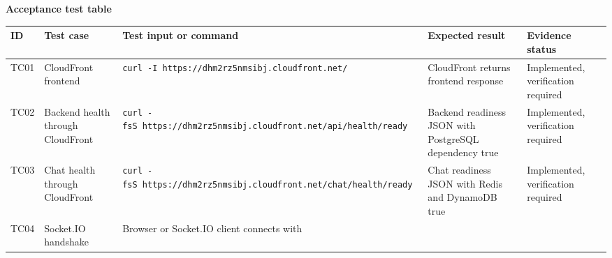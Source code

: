 \vspace{0.5em}\noindent\textbf{Acceptance test table}\par

{
\begingroup
\small
\setlength{\tabcolsep}{3pt}
\renewcommand{\arraystretch}{1.15}
\begin{longtable}{@{}
  >{\raggedright\arraybackslash}p{}
  >{\raggedright\arraybackslash}p{}
  >{\raggedright\arraybackslash}p{}
  >{\raggedright\arraybackslash}p{}
  >{\raggedright\arraybackslash}p{}@{}}
\toprule\noalign{}
\begin{minipage}[b]{\linewidth}\raggedright
ID
\end{minipage} & \begin{minipage}[b]{\linewidth}\raggedright
Test case
\end{minipage} & \begin{minipage}[b]{\linewidth}\raggedright
Test input or command
\end{minipage} & \begin{minipage}[b]{\linewidth}\raggedright
Expected result
\end{minipage} & \begin{minipage}[b]{\linewidth}\raggedright
Evidence status
\end{minipage} \\
\midrule\noalign{}
\endhead
\bottomrule\noalign{}
\endlastfoot
TC01 & CloudFront frontend &
\texttt{curl\ -I\ https:/\allowbreak{}/\allowbreak{}dhm2rz5nmsibj.\allowbreak{}cloudfront.\allowbreak{}net/\allowbreak{}} & CloudFront
returns frontend response & Implemented, verification required \\
TC02 & Backend health through CloudFront &
\texttt{curl\ -fsS\ https:/\allowbreak{}/\allowbreak{}dhm2rz5nmsibj.\allowbreak{}cloudfront.\allowbreak{}net/\allowbreak{}api/\allowbreak{}health/\allowbreak{}ready}
& Backend readiness JSON with PostgreSQL dependency true & Implemented,
verification required \\
TC03 & Chat health through CloudFront &
\texttt{curl\ -fsS\ https:/\allowbreak{}/\allowbreak{}dhm2rz5nmsibj.\allowbreak{}cloudfront.\allowbreak{}net/\allowbreak{}chat/\allowbreak{}health/\allowbreak{}ready}
& Chat readiness JSON with Redis and DynamoDB true & Implemented,
verification required \\
TC04 & Socket.IO handshake & Browser or Socket.IO client connects with

\end{longtable}}
